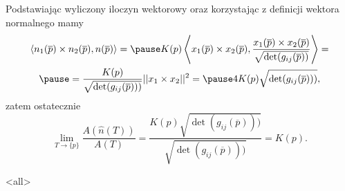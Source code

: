 \begin{frame}[<+->]

Podstawiając wyliczony iloczyn wektorowy oraz korzystając z definicji wektora normalnego mamy 
\begin{multline*}
\langle n_1(\overline{p})\times n_2(\overline{p}) ,n(\overline{p})\rangle=\pause K(p)\left\langle x_1(\overline{p})\times x_2(\overline{p}),\frac{x_1(\overline{p})\times x_2(\overline{p})}{\sqrt{\det (g_{ij}(\overline{p}))}}\right\rangle=\\\pause
=\frac{K(p)}{\sqrt{\det (g_{ij}(\overline{p})))}}||x_1\times x_2||^2=\pause 4K(p)\sqrt{\det (g_{ij}(\overline{p})))},
\end{multline*}
\pause zatem ostatecznie 
\[\lim_{T\to \{p\}}\frac{A(\widehat{n}(T))}{A(T)}=\frac{K(p)\sqrt{\det (g_{ij}(\overline{p})))}}{\sqrt{\det (g_{ij}(\overline{p})))}}=K(p).\]

\end{frame}
\mode<all>
